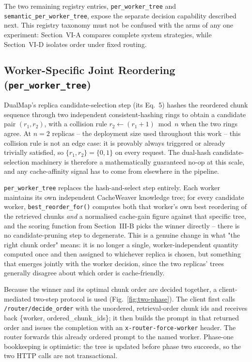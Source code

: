 \documentclass[conference]{IEEEtran}
\begin{document}
The two remaining registry entries, \texttt{per\_worker\_tree} and
\texttt{semantic\_per\_worker\_tree}, expose the separate decision
capability described next. This registry taxonomy must not be confused
with the arms of any one experiment: Section~VI-A compares complete
system strategies, while Section~VI-D isolates order under fixed
routing.

\subsection{Worker-Specific Joint Reordering (\texttt{per\_worker\_tree})}

DualMap's replica candidate-selection step (its Eq.~5) hashes the
reordered chunk sequence through two independent consistent-hashing
rings to obtain a candidate pair $(r_1, r_2)$, with a collision rule
$r_2 \leftarrow (r_1+1) \bmod n$ when the two rings agree. At $n{=}2$
replicas -- the deployment size used throughout this work -- this
collision rule is not an edge case: it is provably always triggered or
already trivially satisfied, so $\{r_1, r_2\} = \{0, 1\}$ on every
request. The dual-hash candidate-selection machinery is therefore a
mathematically guaranteed no-op at this scale, and any cache-affinity
signal has to come from elsewhere in the pipeline.

\texttt{per\_worker\_tree} replaces the hash-and-select step entirely.
Each worker maintains its own independent CacheWeaver knowledge tree;
for every candidate worker, \texttt{best\_reorder\_for()} computes both
that worker's own best reordering of the retrieved chunks \emph{and} a
normalised cache-gain figure against that specific tree, and the
scoring function from Section~III-B picks the winner directly -- there
is no candidate-pruning step to degenerate. This is a genuine change in
what "the right chunk order" means: it is no longer a single,
worker-independent quantity computed once and then assigned to
whichever replica is chosen, but something that emerges jointly with
the worker decision, since the two replicas' trees generally disagree
about which order is cache-friendly.

Because the winner and its optimal chunk order are decided together, a
client-mediated two-step protocol is used (Fig.~\ref{fig:two-phase}).
The client first calls
\texttt{/router/decide\_order} with the unordered, retrieval-order
chunk ids and receives back \{worker, ordered\_chunk\_ids\}; it then
builds the prompt in that returned order and issues the completion with
an \texttt{x-router-force-worker} header. The router forwards this
already ordered prompt to the named worker. Phase-one bookkeeping is
optimistic: the tree is updated before phase two succeeds, so the two
HTTP calls are not transactional.
\end{document}
